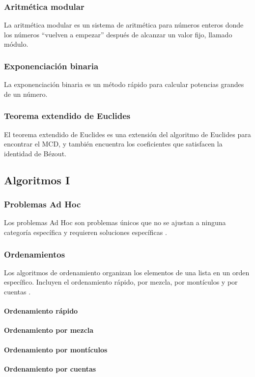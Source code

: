 \subsubsection{Aritmética modular}
La aritmética modular es un sistema de aritmética para números enteros donde los números “vuelven a empezar” después de alcanzar un valor fijo, llamado módulo.
\subsubsection{Exponenciación binaria}
La exponenciación binaria es un método rápido para calcular potencias grandes de un número.
\subsubsection{Teorema extendido de Euclides}
El teorema extendido de Euclides es una extensión del algoritmo de Euclides para encontrar el MCD, y también encuentra los coeficientes que satisfacen la identidad de Bézout.

\subsection{Algoritmos I}
\subsubsection{Problemas Ad Hoc}
Los problemas Ad Hoc son problemas únicos que no se ajustan a ninguna categoría específica y requieren soluciones específicas \cite{ahmed2020competitive}.
\subsubsection{Ordenamientos}
Los algoritmos de ordenamiento organizan los elementos de una lista en un orden específico. Incluyen el ordenamiento rápido, por mezcla, por montículos y por cuentas \cite{skiena2008algorithm}.
\paragraph{Ordenamiento rápido}
\paragraph{Ordenamiento por mezcla}
\paragraph{Ordenamiento por montículos}
\paragraph{Ordenamiento por cuentas}
